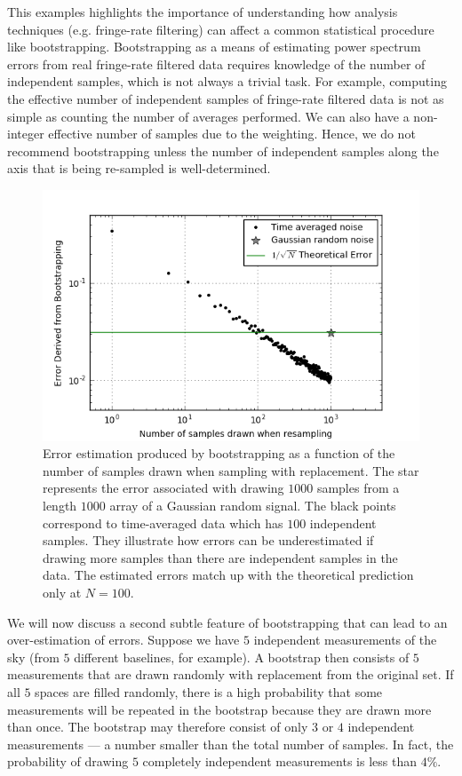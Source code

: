 \documentclass[preprint2,numberedappendix,tighten]{aastex6}  %
\begin{document}
This examples highlights the importance of understanding how analysis techniques (e.g. fringe-rate filtering) can affect a common statistical procedure like bootstrapping. Bootstrapping as a means of estimating power spectrum errors from real fringe-rate filtered data requires knowledge of the number of independent samples, which is not always a trivial task. For example, computing the effective number of independent samples of fringe-rate filtered data is not as simple as counting the number of averages performed. We can also have a non-integer effective number of samples due to the weighting. Hence, we do not recommend bootstrapping unless the number of independent samples along the axis that is being re-sampled is well-determined.

\begin{figure}
	\centering
	\includegraphics[trim={0.3cm 0.3cm 0.3cm 0.3cm},width=\columnwidth]{plots/toy_error1.png}
	\caption{Error estimation produced by bootstrapping as a function of the number of samples drawn when sampling with replacement. The star represents the error associated with drawing $1000$ samples from a length $1000$ array of a Gaussian random signal. The black points correspond to time-averaged data which has $100$ independent samples. They illustrate how errors can be underestimated if drawing more samples than there are independent samples in the data. The estimated errors match up with the theoretical prediction only at $N=100$.}
	\label{fig:toy_error1}
\end{figure}

We will now discuss a second subtle feature of bootstrapping that can lead to an over-estimation of errors. Suppose we have $5$ independent measurements of the sky (from $5$ different baselines, for example). A bootstrap then consists of $5$ measurements that are drawn randomly with replacement from the original set. If all $5$ spaces are filled randomly, there is a high probability that some measurements will be repeated in the bootstrap because they are drawn more than once. The bootstrap may therefore consist of only $3$ or $4$ independent measurements --- a number smaller than the total number of samples.  In fact, the probability of drawing $5$ completely independent measurements is less than $4\%$.
\end{document}
